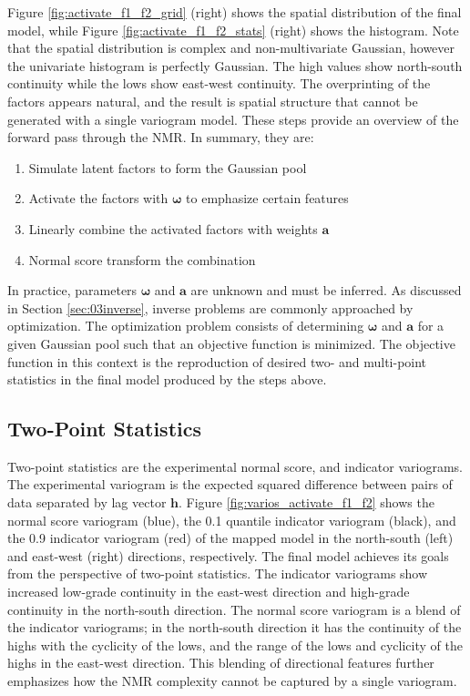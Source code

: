 Figure \ref{fig:activate_f1_f2_grid} (right) shows the spatial distribution of the final model, while Figure \ref{fig:activate_f1_f2_stats} (right) shows the histogram. Note that the spatial distribution is complex and non-multivariate Gaussian, however the univariate histogram is perfectly Gaussian. The high values show north-south continuity while the lows show east-west continuity. The overprinting of the factors appears natural, and the result is spatial structure that cannot be generated with a single variogram model. These steps provide an overview of the forward pass through the \gls{NMR}. In summary, they are:
\begin{enumerate}[noitemsep]
    \item Simulate latent factors to form the Gaussian pool
    \item Activate the factors with $\boldsymbol{\omega}$ to emphasize certain features
    \item Linearly combine the activated factors with weights $\mathbf{a}$
    \item Normal score transform the combination
\end{enumerate}

In practice, parameters $\boldsymbol{\omega}$ and $\mathbf{a}$ are unknown and must be inferred. As discussed in Section \ref{sec:03inverse}, inverse problems are commonly approached by optimization. The optimization problem consists of determining $\boldsymbol{\omega}$ and $\mathbf{a}$ for a given Gaussian pool such that an objective function is minimized. The objective function in this context is the reproduction of desired two- and multi-point statistics in the final model produced by the steps above.

\FloatBarrier
\subsection{Two-Point Statistics}
\label{subsec:03twopt}

Two-point statistics are the experimental normal score, and indicator variograms. The experimental variogram is the expected squared difference between pairs of data separated by lag vector $\mathbf{h}$. Figure \ref{fig:varios_activate_f1_f2} shows the normal score variogram (blue), the 0.1 quantile indicator variogram (black), and the 0.9 indicator variogram (red) of the mapped model in the north-south (left) and east-west (right) directions, respectively. The final model achieves its goals from the perspective of two-point statistics. The indicator variograms show increased low-grade continuity in the east-west direction and high-grade continuity in the north-south direction. The normal score variogram is a blend of the indicator variograms; in the north-south direction it has the continuity of the highs with the cyclicity of the lows, and the range of the lows and cyclicity of the highs in the east-west direction. This blending of directional features further emphasizes how the \gls{NMR} complexity cannot be captured by a single variogram.

